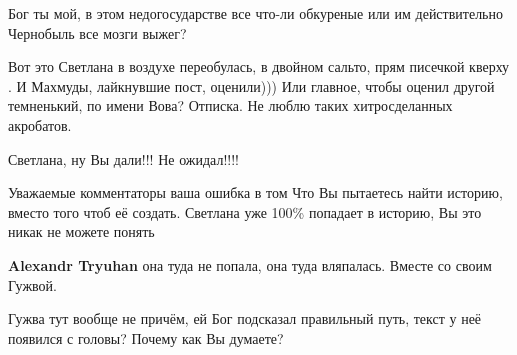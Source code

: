 \begin{itemize}
 
Бог ты мой, в этом недогосударстве все что-ли обкуреные или им действительно Чернобыль все мозги выжег?


Вот это Светлана в воздухе переобулась, в двойном сальто, прям писечкой кверху
. И Махмуды, лайкнувшие пост, оценили))) Или главное, чтобы оценил другой
темненький, по имени Вова? Отписка. Не люблю таких хитросделанных акробатов.


 

Светлана, ну Вы дали!!! Не ожидал!!!!


 

Уважаемые комментаторы ваша ошибка в том Что Вы пытаетесь найти историю, вместо
того чтоб её создать. Светлана уже 100\% попадает в историю, Вы это никак не
можете понять

\begin{itemize}
 
\textbf{Alexandr Tryuhan} она туда не попала, она туда вляпалась. Вместе со своим Гужвой.

 
Гужва тут вообще не причём, ей Бог подсказал правильный путь, текст у неё появился с головы? Почему как Вы думаете?
\end{itemize}

 

\end{itemize}
